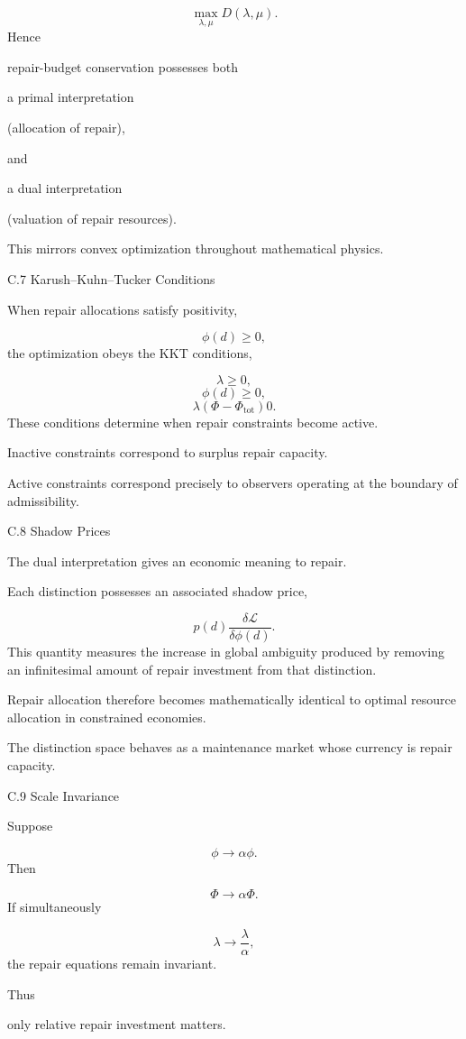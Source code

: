 \documentclass[12pt,oneside]{article}
\theoremstyle{plain}
\theoremstyle{definition}
\theoremstyle{remark}
\begin{document}
\[
\max_{\lambda,\mu}
D(\lambda,\mu).
\]
Hence

repair-budget conservation possesses both

a primal interpretation

(allocation of repair),

and

a dual interpretation

(valuation of repair resources).

This mirrors convex optimization throughout mathematical physics.


C.7 Karush–Kuhn–Tucker Conditions

When repair allocations satisfy positivity,

\[
\phi(d)\ge0,
\]
the optimization obeys the KKT conditions,

\[
\lambda
\ge0,
\]
\[
\phi(d)\ge0,
\]
\[
\lambda
\left(
\Phi-
\Phi_{\mathrm{tot}}
\right)
0. 
\]
These conditions determine when repair constraints become active.

Inactive constraints correspond to surplus repair capacity.

Active constraints correspond precisely to observers operating at the boundary of admissibility.


C.8 Shadow Prices

The dual interpretation gives an economic meaning to repair.

Each distinction possesses an associated shadow price,

\[
p(d)
\frac{\delta\mathcal L}
{\delta\phi(d)}.
\]
This quantity measures the increase in global ambiguity produced by removing an infinitesimal amount of repair investment from that distinction.

Repair allocation therefore becomes mathematically identical to optimal resource allocation in constrained economies.

The distinction space behaves as a maintenance market whose currency is repair capacity.


C.9 Scale Invariance

Suppose

\[
\phi
\rightarrow
\alpha\phi.
\]
Then

\[
\Phi
\rightarrow
\alpha\Phi.
\]
If simultaneously

\[
\lambda
\rightarrow
\frac{\lambda}{\alpha},
\]
the repair equations remain invariant.

Thus

only relative repair investment matters.
\end{document}
